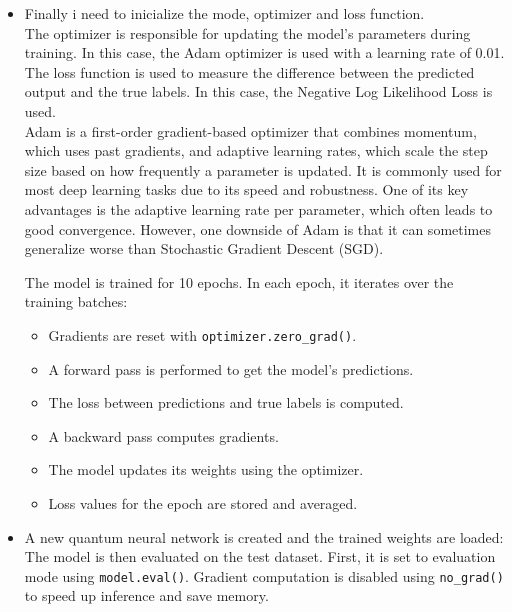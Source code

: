 \documentclass[conference]{IEEEtran}
\begin{document}
\begin{itemize}
        \item Finally i need to inicialize the mode, optimizer and loss function.\\
        The optimizer is responsible for updating the model's parameters during training. In this case, the Adam optimizer \cite{pytorch_adam} is used with a learning rate of 0.01.\\
        The loss function is used to measure the difference between the predicted output and the true labels. In this case, the  Negative Log Likelihood Loss is used.\\

        Adam is a first-order gradient-based optimizer that combines momentum, which uses past gradients, and adaptive learning rates, which scale the step size based on how frequently a parameter is updated. It is commonly used for most deep learning tasks due to its speed and robustness. One of its key advantages is the adaptive learning rate per parameter, which often leads to good convergence. However, one downside of Adam is that it can sometimes generalize worse than Stochastic Gradient Descent (SGD).


        
        The model is trained for 10 epochs. In each epoch, it iterates over the training batches:

    \begin{itemize}
        \item Gradients are reset with \texttt{optimizer.zero\_grad()}.
        \item A forward pass is performed to get the model's predictions.
        \item The loss between predictions and true labels is computed.
        \item A backward pass computes gradients.
        \item The model updates its weights using the optimizer.
        \item Loss values for the epoch are stored and averaged.
    \end{itemize}


    \item A new quantum neural network is created and the trained weights are loaded: \\

    The model is then evaluated on the test dataset. First, it is set to evaluation mode using \texttt{model.eval()}. Gradient computation is disabled using \texttt{no\_grad()} to speed up inference and save memory.\\


\end{itemize}
\end{document}
